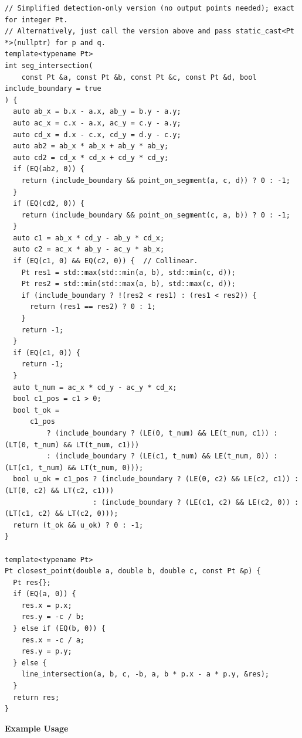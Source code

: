 \begin{lstlisting}[style=cpp]
// Simplified detection-only version (no output points needed); exact for integer Pt.
// Alternatively, just call the version above and pass static_cast<Pt *>(nullptr) for p and q.
template<typename Pt>
int seg_intersection(
    const Pt &a, const Pt &b, const Pt &c, const Pt &d, bool include_boundary = true
) {
  auto ab_x = b.x - a.x, ab_y = b.y - a.y;
  auto ac_x = c.x - a.x, ac_y = c.y - a.y;
  auto cd_x = d.x - c.x, cd_y = d.y - c.y;
  auto ab2 = ab_x * ab_x + ab_y * ab_y;
  auto cd2 = cd_x * cd_x + cd_y * cd_y;
  if (EQ(ab2, 0)) {
    return (include_boundary && point_on_segment(a, c, d)) ? 0 : -1;
  }
  if (EQ(cd2, 0)) {
    return (include_boundary && point_on_segment(c, a, b)) ? 0 : -1;
  }
  auto c1 = ab_x * cd_y - ab_y * cd_x;
  auto c2 = ac_x * ab_y - ac_y * ab_x;
  if (EQ(c1, 0) && EQ(c2, 0)) {  // Collinear.
    Pt res1 = std::max(std::min(a, b), std::min(c, d));
    Pt res2 = std::min(std::max(a, b), std::max(c, d));
    if (include_boundary ? !(res2 < res1) : (res1 < res2)) {
      return (res1 == res2) ? 0 : 1;
    }
    return -1;
  }
  if (EQ(c1, 0)) {
    return -1;
  }
  auto t_num = ac_x * cd_y - ac_y * cd_x;
  bool c1_pos = c1 > 0;
  bool t_ok =
      c1_pos
          ? (include_boundary ? (LE(0, t_num) && LE(t_num, c1)) : (LT(0, t_num) && LT(t_num, c1)))
          : (include_boundary ? (LE(c1, t_num) && LE(t_num, 0)) : (LT(c1, t_num) && LT(t_num, 0)));
  bool u_ok = c1_pos ? (include_boundary ? (LE(0, c2) && LE(c2, c1)) : (LT(0, c2) && LT(c2, c1)))
                     : (include_boundary ? (LE(c1, c2) && LE(c2, 0)) : (LT(c1, c2) && LT(c2, 0)));
  return (t_ok && u_ok) ? 0 : -1;
}

template<typename Pt>
Pt closest_point(double a, double b, double c, const Pt &p) {
  Pt res{};
  if (EQ(a, 0)) {
    res.x = p.x;
    res.y = -c / b;
  } else if (EQ(b, 0)) {
    res.x = -c / a;
    res.y = p.y;
  } else {
    line_intersection(a, b, c, -b, a, b * p.x - a * p.y, &res);
  }
  return res;
}
\end{lstlisting}
\textbf{Example Usage}\par
